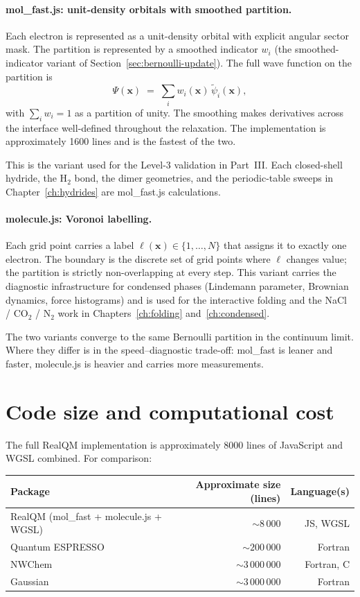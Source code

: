 \paragraph{mol\_fast.js: unit-density orbitals with smoothed partition.} Each electron is represented as a unit-density orbital with explicit angular sector mask. The partition is represented by a smoothed indicator $w_i$ (the smoothed-indicator variant of Section~\ref{sec:bernoulli-update}). The full wave function on the partition is
\[
\Psi(\mathbf{x}) \;=\; \sum_i w_i(\mathbf{x})\, \tilde\psi_i(\mathbf{x}),
\]
with $\sum_i w_i = 1$ as a partition of unity. The smoothing makes derivatives across the interface well-defined throughout the relaxation. The implementation is approximately 1600 lines and is the fastest of the two.

This is the variant used for the Level-3 validation in Part~III. Each closed-shell hydride, the H$_2$ bond, the dimer geometries, and the periodic-table sweeps in Chapter~\ref{ch:hydrides} are mol\_fast.js calculations.

\paragraph{molecule.js: Voronoi labelling.} Each grid point carries a label $\ell(\mathbf{x}) \in \{1, \ldots, N\}$ that assigns it to exactly one electron. The boundary is the discrete set of grid points where $\ell$ changes value; the partition is strictly non-overlapping at every step. This variant carries the diagnostic infrastructure for condensed phases (Lindemann parameter, Brownian dynamics, force histograms) and is used for the interactive folding and the NaCl / CO$_2$ / N$_2$ work in Chapters~\ref{ch:folding} and~\ref{ch:condensed}.

The two variants converge to the same Bernoulli partition in the continuum limit. Where they differ is in the speed--diagnostic trade-off: mol\_fast is leaner and faster, molecule.js is heavier and carries more measurements.

\section{Code size and computational cost}\label{sec:size-cost}

The full RealQM implementation is approximately 8000 lines of JavaScript and WGSL combined. For comparison:

\begin{center}
\begin{tabular}{l r r}
\toprule
Package & Approximate size (lines) & Language(s) \\
\midrule
RealQM (mol\_fast + molecule.js + WGSL) & $\sim 8\,000$ & JS, WGSL \\
Quantum ESPRESSO & $\sim 200\,000$ & Fortran \\
NWChem & $\sim 3\,000\,000$ & Fortran, C \\
Gaussian & $\sim 3\,000\,000$ & Fortran \\
\bottomrule
\end{tabular}
\end{center}

